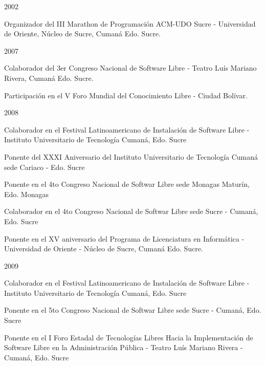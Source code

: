 \documentclass[10pt,letterpaper]{article}
\newenvironment{indentsection}[1]%
{\begin{list}{}%
	{\setlength{\leftmargin}{#1}}%
	\item[]%
}
{\end{list}}
\begin{document}
\begin{indentsection}{\parindent}
  \item {\large 2002}
    \begin{itemize*}
	    \item Organizador del III Marathon de Programación ACM-UDO Sucre - Universidad de Oriente, Núcleo de Sucre, Cumaná Edo. Sucre.
    \end{itemize*}
  \item {\large 2007}
    \begin{itemize*}
	    \item Colaborador del 3er Congreso Nacional de Software Libre - Teatro Luís Mariano Rivera, Cumaná Edo. Sucre.
	    \item Participación en el V Foro Mundial del Conocimiento Libre - Ciudad Bolívar.
    \end{itemize*}
  \item {\large 2008}
    \begin{itemize*}
	    \item Colaborador en el Festival Latinoamericano de Instalación de Software Libre - Instituto Universitario de Tecnología Cumaná, Edo. Sucre
	    \item Ponente del XXXI Aniversario del Instituto Universitario de Tecnología Cumaná sede Cariaco - Edo. Sucre 
	    \item Ponente en el 4to Congreso Nacional de Softwar Libre sede Monagas  Maturín, Edo. Monagas
	    \item Colaborador en el 4to Congreso Nacional de Softwar Libre sede Sucre - Cumaná, Edo. Sucre
	    \item Ponente en el XV aniversario del Programa de Licenciatura en Informática - Universidad de Oriente - Núcleo de Sucre, Cumaná Edo. Sucre.
    \end{itemize*}
  \item {\large 2009}
    \begin{itemize*}
	    \item Colaborador en el Festival Latinoamericano de Instalación de Software Libre - Instituto Universitario de Tecnología Cumaná, Edo. Sucre
	    \item Ponente en el 5to Congreso Nacional de Softwar Libre sede Sucre - Cumaná, Edo. Sucre
	    \item Ponente en el I Foro Estadal de Tecnologías Libres Hacia la Implementación de Software Libre en la Administración Pública - Teatro Luís Mariano Rivera - Cumaná, Edo. Sucre
    \end{itemize*}

\end{indentsection}
\end{document}

